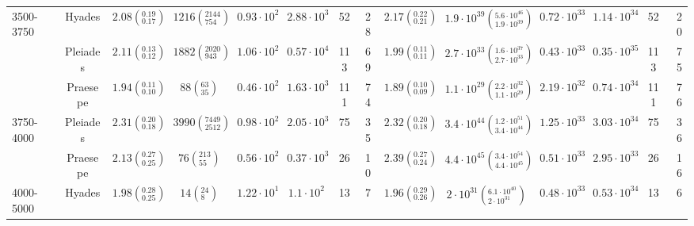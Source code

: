 \begin{tabular}{lccccccccccccr}
3500-3750 & Hyades &  $2.08\left(^{0.19}_{0.17}\right)$ &    $1216\left(^{2144}_{754}\right)$ &    $0.93\cdot 10^{2}$ &    $2.88\cdot 10^{3}$ &                  52 &                  28 &  $2.17\left(^{0.22}_{0.21}\right)$ &  $1.9 \cdot 10^{39}\left(^{5.6 \cdot 10^{46}}_{1.9 \cdot 10^{39}}\right)$ &       $0.72\cdot 10^{33}$ &       $1.14\cdot 10^{34}$ &                    52 &                    20 \\
          & Pleiades &  $2.11\left(^{0.13}_{0.12}\right)$ &    $1882\left(^{2020}_{943}\right)$ &    $1.06\cdot 10^{2}$ &    $0.57\cdot 10^{4}$ &                 113 &                  69 &  $1.99\left(^{0.11}_{0.11}\right)$ &  $2.7 \cdot 10^{33}\left(^{1.6 \cdot 10^{37}}_{2.7 \cdot 10^{33}}\right)$ &       $0.43\cdot 10^{33}$ &       $0.35\cdot 10^{35}$ &                   113 &                    75 \\
          & Praesepe &  $1.94\left(^{0.11}_{0.10}\right)$ &         $88\left(^{63}_{35}\right)$ &    $0.46\cdot 10^{2}$ &    $1.63\cdot 10^{3}$ &                 111 &                  74 &  $1.89\left(^{0.10}_{0.09}\right)$ &  $1.1 \cdot 10^{29}\left(^{2.2 \cdot 10^{32}}_{1.1 \cdot 10^{29}}\right)$ &       $2.19\cdot 10^{32}$ &       $0.74\cdot 10^{34}$ &                   111 &                    76 \\
3750-4000 & Pleiades &  $2.31\left(^{0.20}_{0.18}\right)$ &   $3990\left(^{7449}_{2512}\right)$ &    $0.98\cdot 10^{2}$ &    $2.05\cdot 10^{3}$ &                  75 &                  35 &  $2.32\left(^{0.20}_{0.18}\right)$ &  $3.4 \cdot 10^{44}\left(^{1.2 \cdot 10^{51}}_{3.4 \cdot 10^{44}}\right)$ &       $1.25\cdot 10^{33}$ &       $3.03\cdot 10^{34}$ &                    75 &                    36 \\
          & Praesepe &  $2.13\left(^{0.27}_{0.25}\right)$ &        $76\left(^{213}_{55}\right)$ &    $0.56\cdot 10^{2}$ &    $0.37\cdot 10^{3}$ &                  26 &                  10 &  $2.39\left(^{0.27}_{0.24}\right)$ &  $4.4 \cdot 10^{45}\left(^{3.4 \cdot 10^{54}}_{4.4 \cdot 10^{45}}\right)$ &       $0.51\cdot 10^{33}$ &       $2.95\cdot 10^{33}$ &                    26 &                    16 \\
4000-5000 & Hyades &  $1.98\left(^{0.28}_{0.25}\right)$ &          $14\left(^{24}_{8}\right)$ &    $1.22\cdot 10^{1}$ &     $1.1\cdot 10^{2}$ &                  13 &                   7 &  $1.96\left(^{0.29}_{0.26}\right)$ &      $2 \cdot 10^{31}\left(^{6.1 \cdot 10^{40}}_{2 \cdot 10^{31}}\right)$ &       $0.48\cdot 10^{33}$ &       $0.53\cdot 10^{34}$ &                    13 &                     6 \\

\end{tabular}
